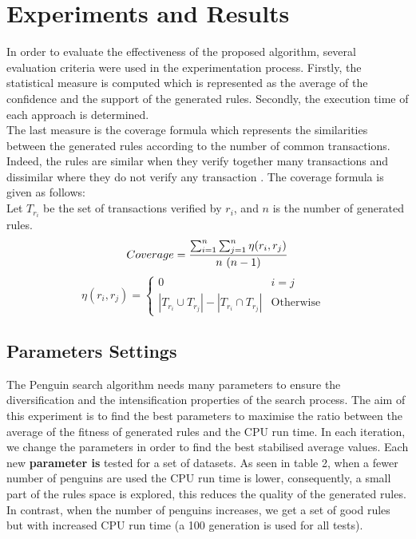 \documentclass[preprint,12pt]{elsarticle}
\begin{document}
\section{Experiments and Results}
In order to evaluate the effectiveness of the proposed algorithm, several evaluation criteria were used in the experimentation process.
Firstly, the statistical measure is computed which is represented as the average of the confidence and the support of the generated rules. 
Secondly, the execution time of each approach is determined. \\
The last measure is the coverage formula which represents the similarities 
between the generated rules according to the number of common transactions. Indeed, 
the rules are similar when they verify together many transactions and dissimilar where
they do not verify any transaction \cite{27}. The coverage formula is given as follows:\\
Let $T_{r_i}$ be the set of transactions verified by $r_{i}$, and $n$ is the number of generated rules.\\
\begin{displaymath}
Coverage =   \frac{\sum_{i=1}^{n}{\sum_{j=1}^{n} {\eta{(r_{i},r_{j})}}}}{n~(n-1)} \\
\end{displaymath}
\begin{displaymath}
\eta{(r_{i},r_{j})} =
\left\lbrace
\begin{array}{ccc}
0          &  i = j & \\
\left|T_{r_{i}} \cup T_{r_{j}}\right| - \left|T_{r_{i}} \cap T_{r_{j}}\right|  & \mbox{Otherwise}  
\end{array}\right.
\end{displaymath}

\subsection{Parameters Settings}
The Penguin search algorithm needs many parameters to ensure the diversification and the intensification properties of the search
process. The aim of this experiment is to find the best parameters to maximise the ratio 
between the average of the fitness of generated rules and the CPU run time. 
In each iteration, we change the parameters in order to find the best stabilised average values. Each new \textbf{parameter is} tested for a set of  datasets. As seen in table 2, when a fewer number of penguins are used the CPU run time is lower, consequently, 
a small part of the rules space is explored, this reduces the quality of the generated rules. In contrast, when the number of penguins 
increases, we get a set of good rules but with increased CPU run time (a 100 generation is used for all tests).
\end{document}

